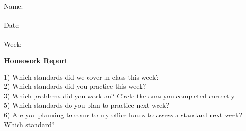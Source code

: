 \documentclass[letterpaper]{article}
\begin{document}
\begin{flushright}
 Name: \underline{\phantom{xxxxxxxxxxxxxxxxxxxxxxxxxxxxxxxxxxxx}}\\
	\ \\
 Date: \underline{\phantom{xxxxxxxxxxxxxxxxxxxxxxxxxxxxxxxxxxxx}}\\
\ \\
Week: \underline{\phantom{xxxxxxxxxxx}}\\
\end{flushright}
\begin{center}
{\Large \bf Homework Report} \\
\large \course
\end{center}
	

\begin{flushleft}
1) Which standards did we cover in class this week? \\
\vspace{1in}
2) Which standards did you practice this week? \\
\vspace{1in}
3) Which problems did you work on?  Circle the ones you completed correctly. \\
\vspace{2in}
5) Which standards do you plan to practice next week? \\
\vspace{1in}
6) Are you planning to come to my office hours to assess a standard next week?  Which standard? \\
\vspace{1in}
\end{flushleft}
\end{document}
